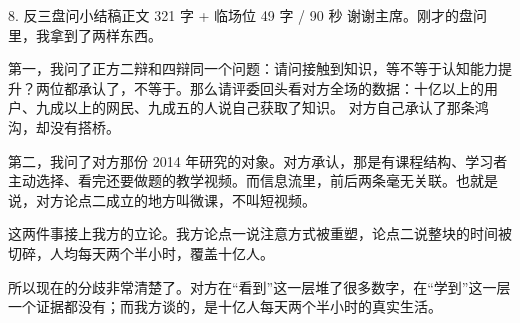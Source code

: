 \documentclass[script,con]{debate}
\begin{document}
\begin{speech}{8. 反三盘问小结稿}{正文 321 字 + 临场位 49 字 / 90 秒}
谢谢主席。刚才的盘问里，我拿到了两样东西。

第一，我问了正方二辩和四辩同一个问题：请问接触到知识，等不等于认知能力提升？两位都承认了，不等于。那么请评委回头看对方全场的数据：十亿以上的用户、九成以上的网民、九成五的人说自己获取了知识。 对方自己承认了那条鸿沟，却没有搭桥。

第二，我问了对方那份 2014 年研究的对象。对方承认，那是有课程结构、学习者主动选择、看完还要做题的教学视频。而信息流里，前后两条毫无关联。也就是说，对方论点二成立的地方叫微课，不叫短视频。

这两件事接上我方的立论。我方论点一说注意方式被重塑，论点二说整块的时间被切碎，人均每天两个半小时，覆盖十亿人。

所以现在的分歧非常清楚了。对方在“看到”这一层堆了很多数字，在“学到”这一层一个证据都没有；而我方谈的，是十亿人每天两个半小时的真实生活。

\end{speech}
\end{document}
